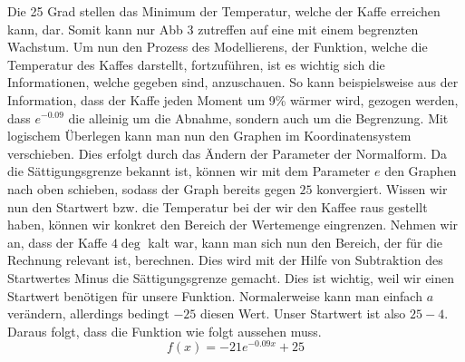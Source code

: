 Die 25 Grad stellen das Minimum der Temperatur, welche der Kaffe erreichen kann, dar. Somit kann nur Abb 3 zutreffen auf eine mit einem begrenzten Wachstum. Um nun den Prozess des Modellierens, der Funktion, welche die Temperatur des Kaffes darstellt, fortzuführen, ist es wichtig sich die Informationen, welche gegeben sind, anzuschauen. So kann beispielsweise aus der Information, dass der Kaffe jeden Moment um 9\% wärmer wird, gezogen werden, dass $e^{-0.09}$ die alleinig um die Abnahme, sondern auch um die Begrenzung. Mit logischem Überlegen kann man nun den Graphen im Koordinatensystem verschieben. Dies erfolgt durch das Ändern der Parameter der Normalform. Da die Sättigungsgrenze bekannt ist, können wir mit dem Parameter $e$ den Graphen nach oben schieben, sodass der Graph bereits gegen $25$ konvergiert. Wissen wir nun den Startwert bzw. die Temperatur bei der wir den Kaffee raus gestellt haben, können wir konkret den Bereich der Wertemenge eingrenzen. Nehmen wir an, dass der Kaffe $4\deg$ kalt war, kann man sich nun den Bereich, der für die Rechnung relevant ist, berechnen. Dies wird mit der Hilfe von Subtraktion des Startwertes Minus die Sättigungsgrenze gemacht. Dies ist wichtig, weil wir einen Startwert benötigen für unsere Funktion. Normalerweise kann man einfach $a$ verändern, allerdings bedingt $-25$ diesen Wert. Unser Startwert ist also $25-4$. Daraus folgt, dass die Funktion wie folgt aussehen muss. \[f(x)=-21e^{-0.09x}+25\]



